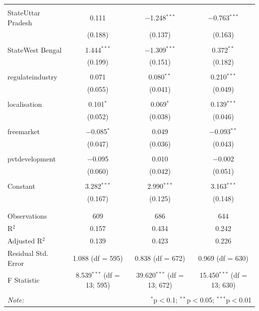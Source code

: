 \documentclass[
]{article}
\begin{document}
\begin{table}[!htbp]
\begin{tabular}{@{\extracolsep{5pt}}lccc}
  & & & \\ 
 StateUttar Pradesh & 0.111 & $-$1.248$^{***}$ & $-$0.763$^{***}$ \\ 
  & (0.188) & (0.137) & (0.163) \\ 
  & & & \\ 
 StateWest Bengal & 1.444$^{***}$ & $-$1.309$^{***}$ & 0.372$^{**}$ \\ 
  & (0.199) & (0.151) & (0.182) \\ 
  & & & \\ 
 regulateindustry & 0.071 & 0.080$^{**}$ & 0.210$^{***}$ \\ 
  & (0.055) & (0.041) & (0.049) \\ 
  & & & \\ 
 localisation & 0.101$^{*}$ & 0.069$^{*}$ & 0.139$^{***}$ \\ 
  & (0.052) & (0.038) & (0.046) \\ 
  & & & \\ 
 freemarket & $-$0.085$^{*}$ & 0.049 & $-$0.093$^{**}$ \\ 
  & (0.047) & (0.036) & (0.043) \\ 
  & & & \\ 
 pvtdevelopment & $-$0.095 & 0.010 & $-$0.002 \\ 
  & (0.060) & (0.042) & (0.051) \\ 
  & & & \\ 
 Constant & 3.282$^{***}$ & 2.990$^{***}$ & 3.163$^{***}$ \\ 
  & (0.167) & (0.125) & (0.148) \\ 
  & & & \\ 
\hline \\[-1.8ex] 
Observations & 609 & 686 & 644 \\ 
R$^{2}$ & 0.157 & 0.434 & 0.242 \\ 
Adjusted R$^{2}$ & 0.139 & 0.423 & 0.226 \\ 
Residual Std. Error & 1.088 (df = 595) & 0.838 (df = 672) & 0.969 (df = 630) \\ 
F Statistic & 8.539$^{***}$ (df = 13; 595) & 39.620$^{***}$ (df = 13; 672) & 15.450$^{***}$ (df = 13; 630) \\ 
\hline 
\hline \\[-1.8ex] 
\textit{Note:}  & \multicolumn{3}{r}{$^{*}$p$<$0.1; $^{**}$p$<$0.05; $^{***}$p$<$0.01} \\ 
\end{tabular} 
\end{table} 
\endgroup

\newpage
\end{document}
